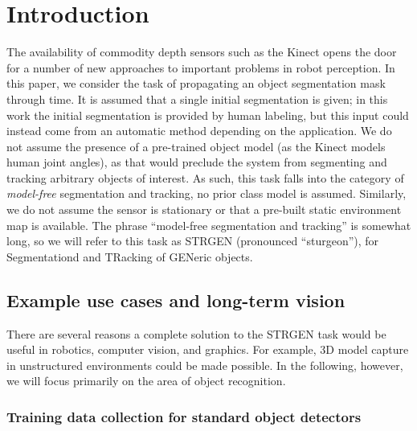 \documentclass[graybox]{svmult}
\begin{document}
\abstract*{\thisabs}
\abstract{\thisabs}

\section{Introduction}
\label{sec:intro}

The availability of commodity depth sensors such as the Kinect opens the door for a number of new approaches to important problems in robot perception.  In this paper, we consider the task of propagating an object segmentation mask through time. It is assumed that a single initial segmentation is given; in this work the initial segmentation is provided by human labeling, but this input could instead come from an automatic method depending on the application.  We do not assume the presence of a pre-trained object model (\ie as the Kinect models human joint angles), as that would preclude the system from segmenting and tracking arbitrary objects of interest.  As such, this task falls into the category of \emph{model-free} segmentation and tracking, \ie no prior class model is assumed.  Similarly, we do not assume the sensor is stationary or that a pre-built static environment map is available.  The phrase ``model-free segmentation and tracking'' is somewhat long, so we will refer to this task as STRGEN (pronounced ``sturgeon''), for Segmentationd and TRacking of GENeric objects.

\subsection{Example use cases and long-term vision}
\label{sec:examples}

There are several reasons a complete solution to the STRGEN task would be useful in robotics, computer vision, and graphics.  For example, 3D model capture in unstructured environments could be made possible.  In the following, however, we will focus primarily on the area of object recognition.

\subsubsection{Training data collection for standard object detectors}
\end{document}
